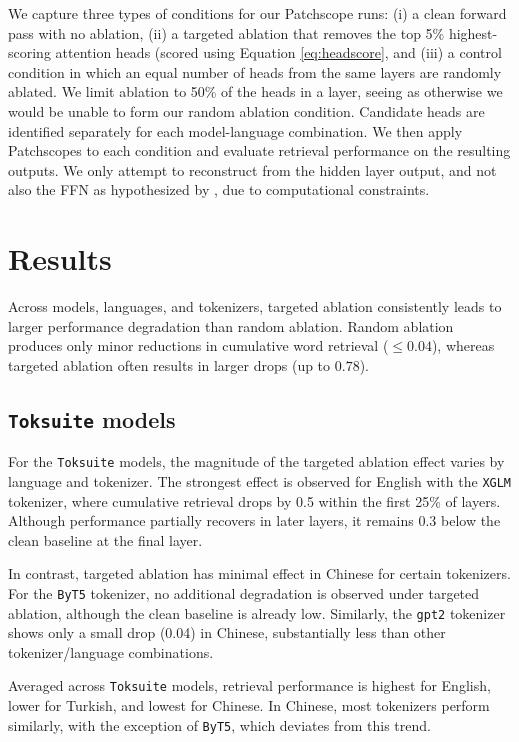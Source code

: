 \documentclass[11pt]{article}
\begin{document}



We capture three types of conditions for our Patchscope runs: (i) a clean forward pass with no ablation, (ii) a targeted ablation that removes the top 5\% highest-scoring attention heads (scored using Equation \ref{eq:headscore}, and (iii) a control condition in which an equal number of heads from the same layers are randomly ablated. We limit ablation to 50\% of the heads in a layer, seeing as otherwise we would be unable to form our random ablation condition. Candidate heads are identified separately for each model-language combination. We then apply Patchscopes to each condition and evaluate retrieval performance on the resulting outputs. We only attempt to reconstruct from the hidden layer output, and not also the FFN as hypothesized by \citet{kaplan2025}, due to computational constraints.

\section{Results}

Across models, languages, and tokenizers, targeted ablation consistently leads to larger performance degradation than random ablation. Random ablation produces only minor reductions in cumulative word retrieval ($\leq 0.04$), whereas targeted ablation often results in larger drops (up to $0.78$).

\subsection{\texttt{Toksuite} models}

For the \texttt{Toksuite} models, the magnitude of the targeted ablation effect varies by language and tokenizer. The strongest effect is observed for English with the \texttt{XGLM} tokenizer, where cumulative retrieval drops by 0.5 within the first 25\% of layers. Although performance partially recovers in later layers, it remains 0.3 below the clean baseline at the final layer.

In contrast, targeted ablation has minimal effect in Chinese for certain tokenizers. For the \texttt{ByT5} tokenizer, no additional degradation is observed under targeted ablation, although the clean baseline is already low. Similarly, the \texttt{gpt2} tokenizer shows only a small drop (0.04) in Chinese, substantially less than other tokenizer/language combinations.

Averaged across \texttt{Toksuite} models, retrieval performance is highest for English, lower for Turkish, and lowest for Chinese. In Chinese, most tokenizers perform similarly, with the exception of \texttt{ByT5}, which deviates from this trend.
\end{document}
